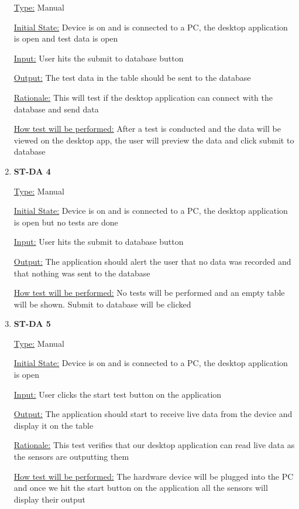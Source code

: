 \documentclass[12pt, titlepage]{article}
\begin{document}
\begin{enumerate}
  \underline{Type:} Manual
            
  \underline{Initial State:} Device is on and is connected to a PC, the desktop application is open and test data is open
            
  \underline{Input:} User hits the submit to database button
            
  \underline{Output:} The test data in the table should be sent to the database
  
  \underline{Rationale:} This will test if the desktop application can connect with the database and send data
            
  \underline{How test will be performed:} After a test is conducted and the data will be viewed on the desktop app, the user will preview the data and click submit to database \\

  \item{\bf{ST-DA 4}}
  
  \underline{Type:} Manual
            
  \underline{Initial State:} Device is on and is connected to a PC, the desktop application is open but no tests are done
            
  \underline{Input:} User hits the submit to database button
            
  \underline{Output:} The application should alert the user that no data was recorded and that nothing was sent to the database
  
            
  \underline{How test will be performed:} No tests will be performed and an empty table will be shown. Submit to database will be clicked \\

  \item{\bf{ST-DA 5}}
  
  \underline{Type:} Manual
            
  \underline{Initial State:} Device is on and is connected to a PC, the desktop application is open
            
  \underline{Input:} User clicks the start test button on the application
            
  \underline{Output:} The application should start to receive live data from the device and display it on the table
  
  \underline{Rationale:} This test verifies that our desktop application can read live data as the sensors are outputting them
            
  \underline{How test will be performed:} The hardware device will be plugged into the PC and once we hit the start button on the application all the sensors will display their output\\
  

\end{enumerate}
\end{document}
